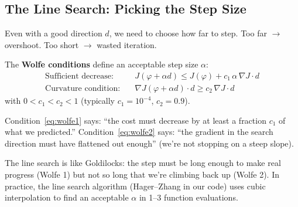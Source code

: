 \documentclass[12pt,a4paper]{article}
\begin{document}
\subsection{The Line Search: Picking the Step Size}

Even with a good direction $d$, we need to choose how far to step. Too far $\to$ overshoot. Too short $\to$ wasted iteration.

The \textbf{Wolfe conditions} define an acceptable step size $\alpha$:
\begin{align}
\text{Sufficient decrease:} \quad & J(\varphi + \alpha d) \leq J(\varphi) + c_1\,\alpha\,\nabla J \cdot d \label{eq:wolfe1}\\
\text{Curvature condition:} \quad & \nabla J(\varphi + \alpha d)\cdot d \geq c_2\,\nabla J \cdot d \label{eq:wolfe2}
\end{align}
with $0 < c_1 < c_2 < 1$ (typically $c_1 = 10^{-4}$, $c_2 = 0.9$).

Condition~\eqref{eq:wolfe1} says: ``the cost must decrease by at least a fraction $c_1$ of what we predicted.'' Condition~\eqref{eq:wolfe2} says: ``the gradient in the search direction must have flattened out enough'' (we're not stopping on a steep slope).

\begin{intuition}
The line search is like Goldilocks: the step must be long enough to make real progress (Wolfe 1) but not so long that we're climbing back up (Wolfe 2). In practice, the line search algorithm (Hager--Zhang in our code) uses cubic interpolation to find an acceptable $\alpha$ in 1--3 function evaluations.
\end{intuition}
\end{document}
